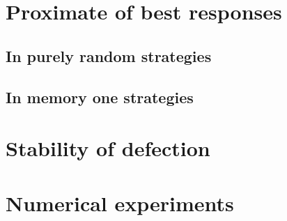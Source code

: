 \documentclass[10pt]{article}
\begin{document}
\section{Proximate of best responses}

\subsection{In purely random strategies}
\subsection{In memory one strategies}

\section{Stability of defection}

\section{Numerical experiments}



\end{document}
